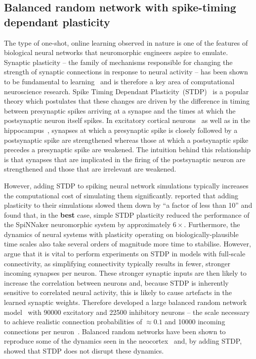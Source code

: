 \documentclass[utf8]{frontiersSCNS} %
\begin{document}
\subsection{Balanced random network with spike-timing dependant plasticity}
\label{sec:method/balanced_random}
The type of one-shot, online learning observed in nature is one of the features of biological neural networks that neuromorphic engineers aspire to emulate.
Synaptic plasticity -- the family of mechanisms responsible for changing the strength of synaptic connections in response to neural activity -- has been shown to be fundamental to learning~\citep{Nabavi2014} and is therefore a key area of computational neuroscience research.
Spike Timing Dependant Plasticity~(STDP)~\citep{Bi1998} is a popular theory which postulates that these changes are driven by the difference in timing between presynaptic spikes arriving at a synapse and the times at which the postsynaptic neuron itself spikes.
In excitatory cortical neurons~\citep{Markram1997} as well as in the hippocampus~\citep{Bi1998}, synapses at which a presynaptic spike is closely followed by a postsynaptic spike are strengthened whereas those at which a postsynaptic spike precedes a presynaptic spike are weakened.
The intuition behind this relationship is that synapses that are implicated in the firing of the postsynaptic neuron are strengthened and those that are irrelevant are weakened.

However, adding STDP to spiking neural network simulations typically increases the computational cost of simulating them significantly. 
\citet{Morrison2007} reported that adding plasticity to their simulations slowed them down by ``a factor of less than 10'' and \citet{Knight2016b} found that, in the \textbf{best} case, simple STDP plasticity reduced the performance of the SpiNNaker neuromorphic system by approximately $6\times$.
Furthermore, the dynamics of neural systems with plasticity operating on biologically-plausible time scales also take several orders of magnitude more time to stabilise.
However, \citeauthor{Morrison2007} argue that it is vital to perform experiments on STDP in models with full-scale connectivity, as simplifying connectivity typically results in fewer, stronger incoming synapses per neuron.
These stronger synaptic inputs are then likely to increase the correlation between neurons and, because STDP is inherently sensitive to correlated neural activity, this is likely to cause artefacts in the learned synaptic weights.
Therefore \citeauthor{Morrison2007} developed a large balanced random network model~\citep{Brunel2000} with \num{90000} excitatory and \num{22500} inhibitory neurons -- the scale necessary to achieve realistic connection probabilities of $\approx0.1$ and \num{10000} incoming connections per neuron~\citep{braitenberg2013cortex}.
Balanced random networks have been shown to reproduce some of the dynamics seen in the neocortex~\citep{Brunel1999,Brunel2000} and, by adding STDP, \citeauthor{Morrison2007} showed that STDP does not disrupt these dynamics.
\end{document}
